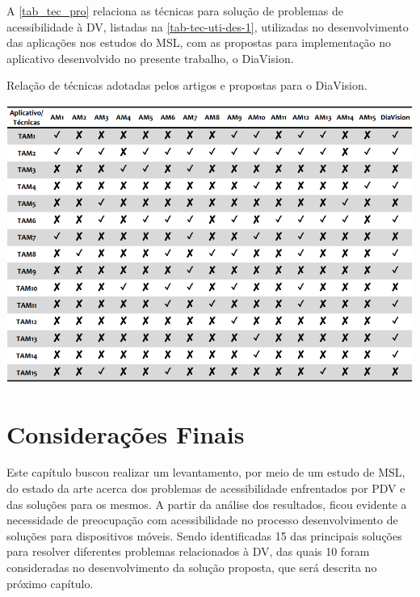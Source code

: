 A \autoref{tab_tec_pro} relaciona as técnicas para solução de problemas de acessibilidade à DV, listadas na \autoref{tab-tec-uti-des-1},
utilizadas no desenvolvimento das aplicações nos estudos do MSL, com as propostas para implementação no aplicativo
desenvolvido no presente trabalho, o DiaVision.
\begin{table}
      \caption{Relação de técnicas adotadas pelos artigos e propostas para o DiaVision.}
      \label{tab_tec_pro}
      \begin{center}
            \includegraphics[scale=0.68]{Imagens/proposta/tecnicas_propostas.png}
      \end{center}
\end{table}

\section{Considerações Finais}

Este capítulo buscou realizar um levantamento, por meio de um estudo de MSL, do estado da arte
acerca dos problemas de acessibilidade enfrentados por PDV e das soluções para os mesmos.
A partir da análise dos resultados, ficou evidente a necessidade de preocupação com
acessibilidade no processo desenvolvimento de soluções para dispositivos móveis.
Sendo identificadas 15 das principais soluções para resolver diferentes problemas relacionados à DV,
das quais 10 foram consideradas no desenvolvimento da solução proposta,
que será descrita no próximo capítulo.